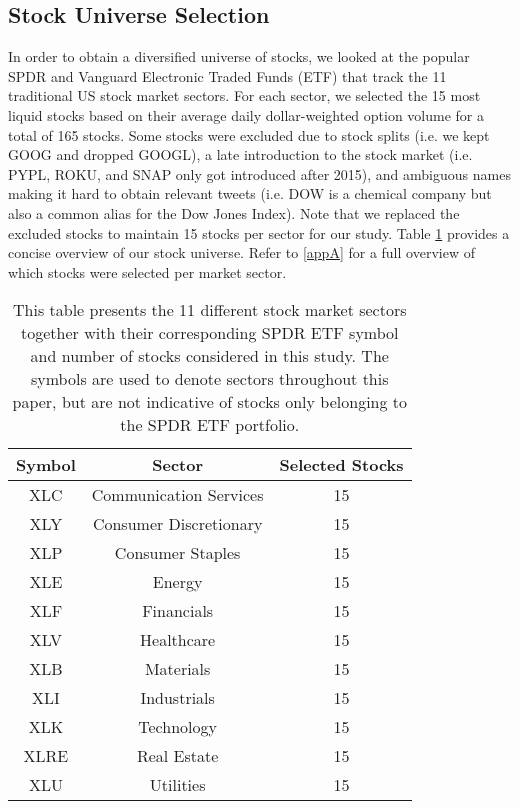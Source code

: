 \documentclass[preprint,1p, times,authoryear]{elsarticle}
\begin{document}
\subsection{Stock Universe Selection}
\label{universe}

In order to obtain a diversified universe of stocks, we looked at the popular SPDR and Vanguard Electronic Traded Funds (ETF) that track the 11 traditional US stock market sectors. For each sector, we selected the 15 most liquid stocks based on their average daily dollar-weighted option volume for a total of 165 stocks. Some stocks were excluded due to stock splits (i.e. we kept GOOG and dropped GOOGL), a late introduction to the stock market (i.e. PYPL, ROKU, and SNAP only got introduced after 2015), and ambiguous names making it hard to obtain relevant tweets (i.e. DOW is a chemical company but also a common alias for the Dow Jones Index). Note that we replaced the excluded stocks to maintain 15 stocks per sector for our study. Table \ref{tab:symb} provides a concise overview of our stock universe. Refer to \ref{appA} for a full overview of which stocks were selected per market sector. 

\begin{table}[!ht]
\setlength{\tabcolsep}{10pt} %
\caption{This table presents the 11 different stock market sectors together with their corresponding SPDR ETF symbol and number of stocks considered in this study. The symbols are used to denote sectors throughout this paper, but are not indicative of stocks only belonging to the SPDR ETF portfolio. }
  \centering
\begin{tabular}{ccc}
\hline
\textbf{Symbol} & \textbf{Sector}        & \textbf{Selected Stocks} \\
\hline
XLC             & Communication Services & 15 \\
XLY             & Consumer Discretionary & 15 \\
XLP             & Consumer Staples       & 15 \\
XLE             & Energy                 & 15 \\
XLF             & Financials             & 15 \\
XLV             & Healthcare             & 15 \\
XLB             & Materials              & 15 \\
XLI             & Industrials            & 15 \\
XLK             & Technology             & 15 \\
XLRE            & Real Estate            & 15 \\
XLU             & Utilities              & 15 \\
\hline
\end{tabular}
\label{tab:symb}
\end{table}
\end{document}
